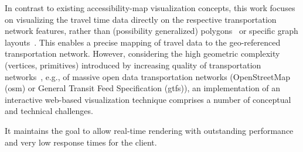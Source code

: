     In contrast to existing accessibility-map visualization concepts, this work
    focuses on visualizing the travel time data directly on the respective
    transportation network features, rather than (possibility generalized)
    polygons~\cite{Glander2010} or specific graph layouts~\cite{Krause2012}.
    This enables a precise mapping of travel data to the geo-referenced
    transportation network. However, considering the high geometric complexity
    (vertices, primitives) introduced by increasing quality of transportation
    networks~\cite{Zielstra2010}, e.g., of massive open data transportation
    networks (OpenStreetMap (\acrshort{osm}) or General Transit Feed
    Specification (\acrshort{gtfs})),
    an implementation of an interactive web-based visualization technique
    comprises a number of conceptual and technical challenges.\par

    It maintains the goal to allow real-time rendering with outstanding
    performance and very low response times for the client.\par

